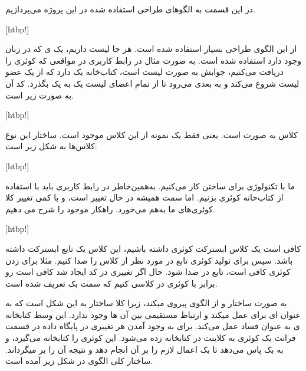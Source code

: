 

در این قسمت به الگوهای طراحی  استفاده شده در این پروژه می‌پردازیم.


	 
%	
	[htbp!]
	
	از این الگوی طراحی بسیار استفاده شده است. هر جا لیست داریم، یک  ی  که در زبان وجود دارد استفاده شده است. به صورت مثال در رابط کاربری در مواقعی که کوئری‌ را دریافت می‌کنیم، جوابش به صورت لیست است، کتاب‌خانه  یک  دارد که از یک عضو لیست شروع می‌کند و به بعدی می‌رود تا از تمام اعضای لیست یک به یک بگذرد. کد آن به صورت زیر است.
	
%	
	[htbp!]
	
	
	 
	
کلاس  به صورت  است. یعنی فقط یک نمونه از این کلاس موجود است. ساختار این نوع کلاس‌ها به شکل زیر است:

%
	[htbp!]
	
	 
	
	ما با تکنولوژی  برای ساختن  کار می‌کنیم. به‌همین‌خاطر در رابط کاربری باید با استفاده از کتاب‌خانه  کوئری بزنیم. اما سمت  همیشه در حال تغییر است، و با کمی تغییر کلا کوئری‌های ما به‌هم می‌خورد. راهکار موجود را شرح می دهیم.
	
		[htbp!]
		
		کافی است یک کلاس ابسترکت کوئری داشته باشیم، این کلاس یک تابع ابسترکت  داشته باشد. سپس برای تولید کوئری تابع  در  مورد نظر از کلاس را صدا کنیم. مثلا برای زدن کوئری  کافی است، تابع  در  صدا شود. حال اگر تغییری در کد ایجاد شد کافی است  رو برابر با کوئری در کلاسی کنیم که سمت بک تعریف شده است.

																												 
به صورت 
ساختار 
و 
از الگوی
پیروی میکند، زیرا کلا ساختار به این شکل است که 
به عنوان 
ای برای 
عمل میکند و ارتباط مستقیمی بین آن ها وجود ندارد. این وسط کتابخانه ی
به عنوان فساد عمل می‌کند. برای به وجود آمدن هر تغییری در پایگاه داده در قسمت فرانت یک کوئری به کلاینت در کتابخانه 
زده می‌شود. این کوئری را کتابخانه می‌گیرد، و به بک پاس می‌دهد تا بک اعمال لازم را بر آن انجام دهد و نتیجه آن را بر میگرداند. ساختار کلی الگوی 
در شکل زیر آمده است.


